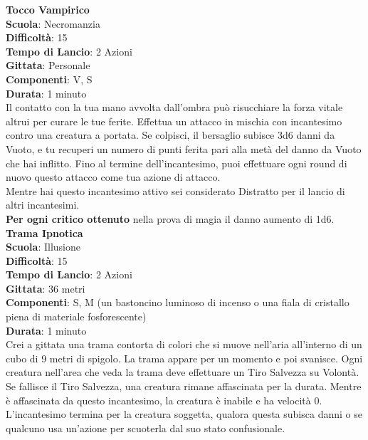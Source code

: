 \begin{multicols}{2}
\medskip\textbf{Tocco Vampirico}\\
\textbf{Scuola}: Necromanzia\\
\textbf{Difficoltà}: 15\\
\textbf{Tempo di Lancio}: 2 Azioni\\
\textbf{Gittata}: Personale\\
\textbf{Componenti}: V, S\\
\textbf{Durata}: 1 minuto \\
Il contatto con la tua mano avvolta dall'ombra può risucchiare la forza vitale altrui per curare le tue ferite. Effettua un attacco in mischia con incantesimo contro una creatura a portata. Se colpisci, il bersaglio subisce 3d6 danni da Vuoto, e tu recuperi un numero di punti ferita pari alla metà del danno da Vuoto che hai inflitto. Fino al termine dell'incantesimo, puoi effettuare ogni round di nuovo questo attacco come tua azione di attacco.\\
Mentre hai questo incantesimo attivo sei considerato Distratto per il lancio di altri incantesimi.\\
\textbf{Per ogni critico ottenuto} nella prova di magia il danno aumento di 1d6.\\

\medskip\textbf{Trama Ipnotica}\\
\textbf{Scuola}: Illusione\\
\textbf{Difficoltà}: 15\\
\textbf{Tempo di Lancio}: 2 Azioni\\
\textbf{Gittata}: 36 metri\\
\textbf{Componenti}: S, M (un bastoncino luminoso di incenso o una fiala di cristallo piena di materiale fosforescente)\\
\textbf{Durata}: 1 minuto\\
Crei a gittata una trama contorta di colori che si muove nell'aria all'interno di un cubo di 9 metri di spigolo. La trama appare per un momento e poi svanisce. Ogni creatura nell'area che veda la trama deve effettuare un Tiro Salvezza su Volontà. Se fallisce il Tiro Salvezza, una creatura rimane affascinata per la durata. Mentre è affascinata da questo incantesimo, la creatura è inabile e ha velocità 0. L'incantesimo termina per la creatura soggetta, qualora questa subisca danni o se qualcuno usa un'azione per scuoterla dal suo stato confusionale.


\end{multicols}
